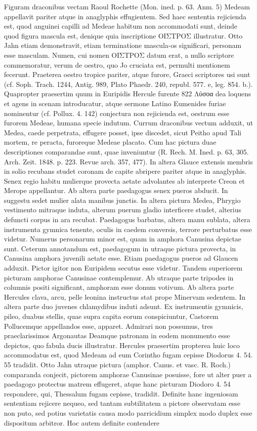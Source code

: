 \documentclass[a4paper, 11pt, oneside, polutonikogreek, german]{article}
\begin{document}
Figuram draconibus vectam Raoul Rochette (Mon. ined. p. 63. Anm. 5) Medeam appellavit pariter atque in anaglyphis effugientem. Sed haec sententia rejicienda est, quod anguinei capilli ad Medeae habitum non accommodati sunt, deinde quod figura mascula est, denique quia inscriptione ΟΙΣΤΡΟΣ illustratur. Otto Jahn etiam demonstravit, etiam terminatione mascula-os significari, personam esse masculam. Numen, cui nomen ΟΙΣΤΡΟΣ datum erat, a nullo scriptore commemoratur, verum de oestro, quo Jo cruciata est, permulti mentionem fecerunt. Praeterea oestro tropice pariter, atque furore, Graeci scriptores usi sunt (cf. Soph. Trach. 1244, Antig. 989, Plato Phaedr. 240, republ. 577. e, leg. 854. b.). Quapropter praesertim quum in Euripidis Hercule furente 822 Λύσοα dea loquens et agens in scenam introducatur, atque sermone Latino Eumenides furiae nominentur (cf. Pollux. 4. 142) conjectura non rejicienda est, oestrum esse furorem Medeae, humana specie indutum. Currum draconibus vectum adduxit, ut Medea, caede perpetrata, effugere posset, ipse discedet, sicut Peitho apud Tali mortem, re peracta, furoreque Medeae placato. Cum hac pictura duae descriptiones comparandae sunt, quae inveniuntur (R. Rech. M. Ined. p. 63, 305. Arch. Zeit. 1848. p. 223. Revue arch. 357, 477). In altera Glauce extensis membris in solio recubans studet coronam de capite abripere pariter atque in anaglyphis. Senex regio habitu mulierque provecta aetate advolantes ab interprete Creon et Merope appellantur. Ab altera parte paedagogus senex pueros abducit. In suggestu sedet mulier alata manibus junctis. In altera pictura Medea, Phrygio vestimento mitraque induta, alterum puerum gladio interficere studet, alterius defuncti corpus in ara recubat. Paedagogus barbatus, altera manu sublata, altera instrumenta gymnica tenente, oculis in caedem conversis, terrore perturbatus esse videtur. Numerus personarum minor est, quam in amphora Canusina depictae sunt. Ceterum annotandum est, paedagogum in utraque pictura provecta, in Canusina amphora juvenili aetate esse. Etiam paedagogus pueros ad Glaucen adduxit. Pictor igitor non Euripidem secutus esse videtur. Tandem superiorem picturam amphorae Canusinae contemplemur. Ab utraque parte tripodes in columnis positi significant, amphoram esse donum votivum. Ab altera parte Hercules clava, arcu, pelle leonina instructus stat prope Minervam sedentem. In altera parte duo juvenes chlamydibus induti adsunt. Ex instrumentis gymnicis, pileo, duabus stellis, quae supra capita eorum conspiciuntur, Castorem Pollucemque appellandos esse, apparet. Admirari non possumus, tres praeclarissimos Argonautas Deamque patronam in eodem monumento esse depictos, quo fabula ducis illustratur. Hercules praesertim propterea huic loco accommodatus est, quod Medeam ad eum Corintho fugam cepisse Diodorus 4. 54. 55 tradidit. Otto Jahn utraque pictura (amphor. Canus. et vasc. R. Roch.) comparanda conjecit, pictorem amphorae Canusinae posuisse, fore ut alter puer a paedagogo protectus matrem effugeret, atque hanc picturam Diodoro 4. 54 respondere, qui, Thessalum fugam cepisse, tradidit. Definite hanc ingeniosam sententiam rejicere nequeo, sed tantam subtilitatem a pictore observatam esse non puto, sed potius varietatis causa modo parricidium simplex modo duplex esse dispositum arbitror. Hoc autem definite contendere 
\end{document}

